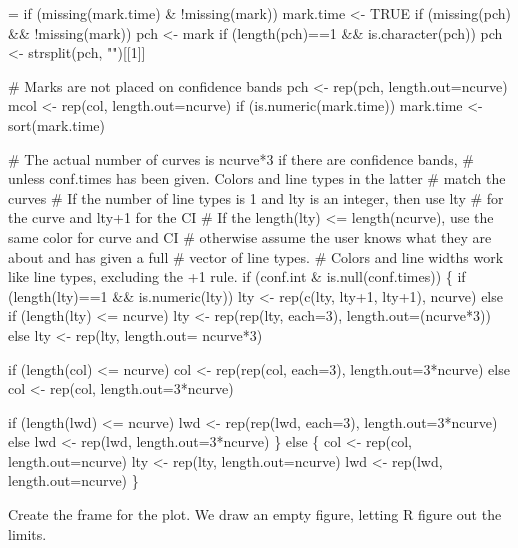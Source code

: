 \documentclass{article}
\begin{document}
\begin{nwchunk}
=
 if (missing(mark.time) & !missing(mark)) mark.time <- TRUE
 if (missing(pch) && !missing(mark)) pch <- mark
 if (length(pch)==1 && is.character(pch)) pch <- strsplit(pch, "")[[1]]
 
 # Marks are not placed on confidence bands
 pch  <- rep(pch, length.out=ncurve)
 mcol <- rep(col, length.out=ncurve)
 if (is.numeric(mark.time)) mark.time <- sort(mark.time)
 
 # The actual number of curves is ncurve*3 if there are confidence bands,
 #  unless conf.times has been given.  Colors and line types in the latter
 #  match the curves
 # If the number of line types is 1 and lty is an integer, then use lty 
 #    for the curve and lty+1 for the CI
 # If the length(lty) <= length(ncurve), use the same color for curve and CI
 #   otherwise assume the user knows what they are about and has given a full
 #   vector of line types.
 # Colors and line widths work like line types, excluding the +1 rule.
 if (conf.int & is.null(conf.times)) \{
     if (length(lty)==1 && is.numeric(lty))
         lty <- rep(c(lty, lty+1, lty+1), ncurve)
     else if (length(lty) <= ncurve)
         lty <- rep(rep(lty, each=3), length.out=(ncurve*3))
     else lty <- rep(lty, length.out= ncurve*3)
     
     if (length(col) <= ncurve) col <- rep(rep(col, each=3), length.out=3*ncurve)
     else col <- rep(col, length.out=3*ncurve)
     
     if (length(lwd) <= ncurve) lwd <- rep(rep(lwd, each=3), length.out=3*ncurve)
     else lwd <- rep(lwd, length.out=3*ncurve)
 \}
 else \{
     col  <- rep(col, length.out=ncurve)
     lty  <- rep(lty, length.out=ncurve)
     lwd  <- rep(lwd, length.out=ncurve)
 \}
\end{nwchunk}


Create the frame for the plot. 
We draw an empty figure, letting R figure out the limits.
\end{document}
